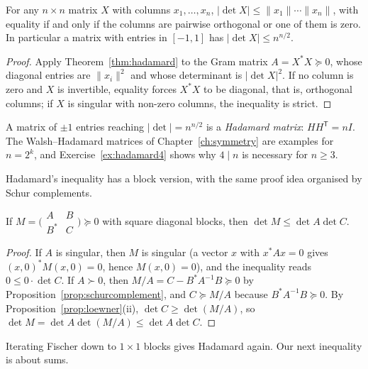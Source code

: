 \begin{corollary}\label{cor:hadamardvol}
For any $n\times n$ matrix $X$ with columns $x_1,\dots,x_n$, $|\det X|\le\|x_1\|\cdots\|x_n\|$, with equality if and only if the
columns are pairwise orthogonal or one of them is zero. In particular a matrix with entries in $[-1,1]$ has $|\det X|\le n^{n/2}$.
\end{corollary}
\begin{proof}
Apply Theorem~\ref{thm:hadamard} to the Gram matrix $A=X^*X\succeq0$, whose diagonal entries are $\|x_i\|^2$ and whose determinant is
$|\det X|^2$. If no column is zero and $X$ is invertible, equality forces $X^*X$ to be diagonal, that is, orthogonal columns; if $X$ is
singular with non-zero columns, the inequality is strict.
\end{proof}

A matrix of $\pm1$ entries reaching $|\det|=n^{n/2}$ is a \emph{Hadamard matrix}: $HH^{\mathsf T}=nI$. The Walsh--Hadamard matrices of
Chapter~\ref{ch:symmetry} are examples for $n=2^k$, and Exercise~\ref{ex:hadamard4} shows why $4\mid n$ is necessary for $n\ge3$.

Hadamard's inequality has a block version, with the same proof idea organised by Schur complements.

\begin{theorem}\label{thm:fischer}
If $M=\bigl(\begin{smallmatrix}A&B\\B^*&C\end{smallmatrix}\bigr)\succeq0$ with square diagonal blocks, then $\det M\le\det A\det C$.
\end{theorem}
\begin{proof}
If $A$ is singular, then $M$ is singular (a vector $x$ with $x^*Ax=0$ gives $(x,0)^*M(x,0)=0$, hence $M(x,0)=0$), and the inequality
reads $0\le0\cdot\det C$. If $A\succ0$, then $M/A=C-B^*A^{-1}B\succeq0$ by Proposition~\ref{prop:schurcomplement}, and $C\succeq M/A$
because $B^*A^{-1}B\succeq0$. By Proposition~\ref{prop:loewner}(ii), $\det C\ge\det(M/A)$, so $\det M=\det A\det(M/A)\le\det A\det C$.
\end{proof}

Iterating Fischer down to $1\times1$ blocks gives Hadamard again. Our next inequality is about sums.

